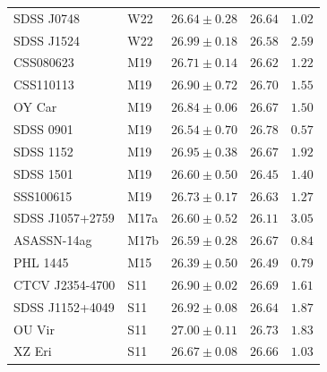 \begin{table}
\begin{tabular}{llccc}
        SDSS J0748       &  W22                 & $26.64 \pm 0.28$                  & $26.64$                          &  $1.02$ \\
        SDSS J1524       &  W22                 & $26.99 \pm 0.18$                  & $26.58$                          &  $2.59$ \\
        CSS080623        &  M19                 & $26.71 \pm 0.14$                  & $26.62$                          &  $1.22$ \\
        CSS110113        &  M19                 & $26.90 \pm 0.72$                  & $26.70$                          &  $1.55$ \\
        OY Car           &  M19                 & $26.84 \pm 0.06$                  & $26.67$                          &  $1.50$ \\
        SDSS 0901        &  M19                 & $26.54 \pm 0.70$                  & $26.78$                          &  $0.57$ \\
        SDSS 1152        &  M19                 & $26.95 \pm 0.38$                  & $26.67$                          &  $1.92$ \\
        SDSS 1501        &  M19                 & $26.60 \pm 0.50$                  & $26.45$                          &  $1.40$ \\
        SSS100615        &  M19                 & $26.73 \pm 0.17$                  & $26.63$                          &  $1.27$ \\
        SDSS J1057+2759  &  M17a                & $26.60 \pm 0.52$                  & $26.11$                          &  $3.05$ \\
        ASASSN-14ag      &  M17b                & $26.59 \pm 0.28$                  & $26.67$                          &  $0.84$ \\
        PHL 1445         &  M15                 & $26.39 \pm 0.50$                  & $26.49$                          &  $0.79$ \\
        CTCV J2354-4700  &  S11                 & $26.90 \pm 0.02$                  & $26.69$                          &  $1.61$ \\
        SDSS J1152+4049  &  S11                 & $26.92 \pm 0.08$                  & $26.64$                          &  $1.87$ \\
        OU Vir           &  S11                 & $27.00 \pm 0.11$                  & $26.73$                          &  $1.83$ \\
        XZ Eri           &  S11                 & $26.67 \pm 0.08$                  & $26.66$                          &  $1.03$ \\

\end{tabular}
\end{table}
